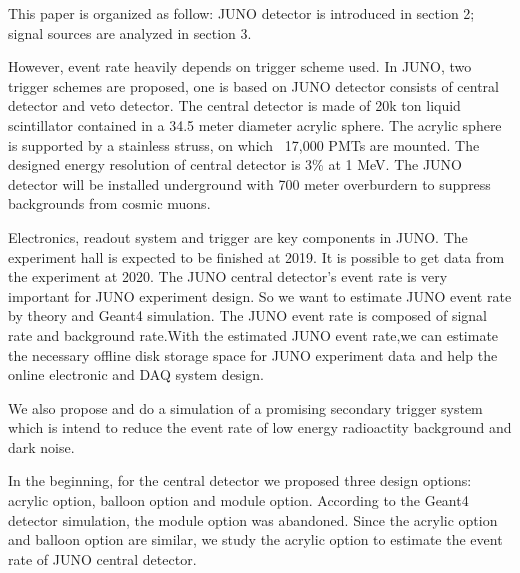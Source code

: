 \documentclass[a4paper,10pt,twoside]{paper}
\begin{document}
\begin{multicols}{2}
                This paper is organized as follow: JUNO detector is introduced in section 2; signal sources are analyzed in section 3.

                However, event rate heavily depends on trigger scheme used. In JUNO, two trigger schemes are proposed, one is based on 
                JUNO detector consists of central detector and veto detector. 
                The central detector is made of 20k ton liquid scintillator contained in a 34.5 meter diameter acrylic sphere. 
                The acrylic sphere is supported by a stainless struss, on which ~17,000 PMTs are mounted. The designed energy resolution of central detector is 3\% at 1 MeV.
                The JUNO detector will be installed underground with 700 meter overburdern to suppress backgrounds from cosmic muons.
                
		Electronics, readout system and trigger are key components in JUNO.
                The experiment hall is expected to be finished at 2019. 
		It is possible to get data from the experiment at 2020.
		The JUNO central detector's event rate is very important for 
		JUNO experiment design. So we want to estimate JUNO
		event rate by theory and Geant4 simulation. The
		JUNO event rate is composed of signal rate and background
		rate.With the estimated JUNO event rate,we can estimate the necessary
		offline disk storage space for JUNO experiment data and help the 
		online electronic and DAQ system design.
		
		We also propose and do a simulation of a promising secondary trigger system which is intend to
		reduce the event rate of low energy 
		radioactity background and dark noise. 

		In the beginning, for the central detector we proposed
		three design options: acrylic option, balloon option and 
		module option. According to the Geant4 detector simulation,
		the module option was abandoned. Since the acrylic option
		and balloon option are similar, we study the acrylic option
		to estimate the event rate of JUNO central detector.





\end{multicols}
\end{document}
